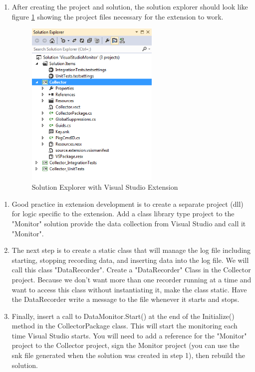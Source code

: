  \begin{Answer}

\begin{enumerate}
\item
After creating the project and solution, the solution explorer should look like figure \ref{fig:SolutionExplorer} showing the project files necessary for the extension to work.
\begin{figure}
	\centering
	\includegraphics[width=2.5in]{Graphics/SolutionExplorer.png}
	\caption{Solution Explorer with Visual Studio Extension}
	\label{fig:SolutionExplorer}
\end{figure}
\end{enumerate}
\end{Answer}

\begin{Exercise}[type={program}, difficulty={1}]
\begin{enumerate}
\item
Good practice in extension development is to create a separate project (dll) for logic specific to the extension.  Add a class library type project to  the "Monitor" solution provide the data collection from Visual Studio and call it "Monitor".
\item
The next step is to create a static class that will manage the log file including starting, stopping recording data, and inserting data into the log file.  We will call this class "DataRecorder".   
Create a "DataRecorder" Class in the Collector project.  Because we don't want more than one recorder running at a time and want to access this class without instantiating it, make the class static.  Have the DataRecorder write a message to the file whenever it starts and stops.
\item
Finally, insert a call to DataMonitor.Start() at the end of the Initialize() method in the CollectorPackage class.  This will start the monitoring each time Visual Studio starts.  You will need to add a reference for the "Monitor" project to the Collector project, sign the Monitor project (you can use the snk file generated when the solution was created in step 1), then rebuild the solution.
\end{enumerate}
\end{Exercise}



